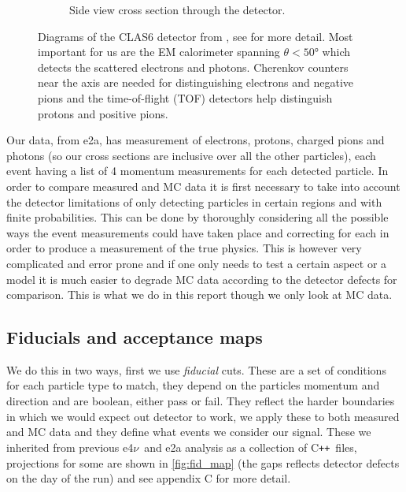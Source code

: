 \documentclass[a4paper,12pt]{article}
\newcommand{\efn}{e4$\nu$}
\newcommand{\CC}{C\texttt{++}}
\begin{document}
\begin{figure}[H]
\begin{subfigure}[b]{0.5\textwidth}
        \caption{Side view cross section through the detector.}
    \end{subfigure}
    \caption{\label{fig:CLAS}
        Diagrams of the CLAS6 detector from \cite{meckingCEBAFLargeAcceptance2003}, see for more detail.
        Most important for us are the EM calorimeter spanning $\theta < 50\si{\degree}$ which detects the scattered electrons and photons.
        Cherenkov counters near the axis are needed for distinguishing electrons and negative pions and the time-of-flight (TOF) detectors help distinguish protons and positive pions.
    }
\end{figure}

Our data, from e2a, has measurement of electrons, protons, charged pions and photons (so our cross sections are inclusive over all the other particles), each event having a list of 4 momentum measurements for each detected particle.
In order to compare measured and MC data it is first necessary to take into account the detector limitations of only detecting particles in certain regions and with finite probabilities.
This can be done by thoroughly considering all the possible ways the event measurements could have taken place and correcting for each in order to produce a measurement of the true physics.
This is however very complicated and error prone and if one only needs to test a certain aspect or a model it is much easier to degrade MC data according to the detector defects for comparison.
This is what we do in this report though we only look at MC data.

\subsection{Fiducials and acceptance maps}
We do this in two ways, first we use \emph{fiducial} cuts.
These are a set of conditions for each particle type to match, they depend on the particles momentum and direction and are boolean, either pass or fail.
They reflect the harder boundaries in which we would expect out detector to work, we apply these to both measured and MC data and they define what events we consider our signal.
These we inherited from previous \efn\ and e2a analysis as a collection of \CC\ files, projections for some are shown in \cref{fig:fid_map} (the gaps reflects detector defects on the day of the run) and see \cite{mclauchlanDeltaElectroproduction12C} appendix C for more detail.
\end{document}
